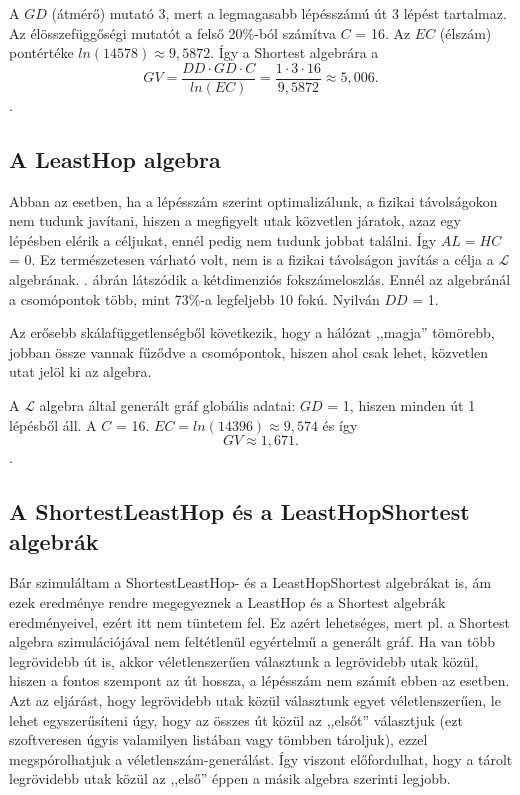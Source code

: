     A $GD$ (átmérő) mutató 3, mert a legmagasabb lépésszámú út 3 lépést tartalmaz. Az élösszefüggőségi mutatót a felső 20\%-ból számítva $C$ = 16. Az $EC$ (élszám) pontértéke $ln(14578) \approx 9,5872$. Így a Shortest algebrára a $$GV = \frac{DD \cdot GD \cdot C}{ln(EC)} = \frac{1 \cdot 3 \cdot 16}{9,5872} \approx 5,006.$$.

    \subsection{A LeastHop algebra}
    Abban az esetben, ha a lépésszám szerint optimalizálunk, a fizikai távolságokon nem tudunk javítani, hiszen a megfigyelt utak közvetlen járatok, azaz egy lépésben elérik a céljukat, ennél pedig nem tudunk jobbat találni. Így $AL=HC$ = 0. Ez természetesen várható volt, nem is a fizikai távolságon javítás a célja a $\mathcal{L}$ algebrának. . ábrán látszódik a kétdimenziós fokszámeloszlás. Ennél az algebránál a csomópontok több, mint 73\%-a legfeljebb 10 fokú. Nyilván $DD$ = 1.

    Az erősebb skálafüggetlenségből következik, hogy a hálózat ,,magja'' tömörebb, jobban össze vannak fűződve a csomópontok, hiszen ahol csak lehet, közvetlen utat jelöl ki az algebra.

    A $\mathcal{L}$ algebra által generált gráf globális adatai: $GD$ = 1, hiszen minden út 1 lépésből áll. A $C$ = 16. $EC=ln(14396) \approx 9,574$ és így $$GV \approx 1,671.$$.

    \subsection{A ShortestLeastHop és a LeastHopShortest algebrák}
    Bár szimuláltam a ShortestLeastHop- és a LeastHopShortest algebrákat is, ám ezek eredménye rendre megegyeznek a LeastHop és a Shortest algebrák eredményeivel, ezért itt nem tüntetem fel. Ez azért lehetséges, mert pl. a Shortest algebra szimulációjával nem feltétlenül egyértelmű a generált gráf. Ha van több legrövidebb út is, akkor véletlenszerűen választunk a legrövidebb utak közül, hiszen a fontos szempont az út hossza, a lépésszám nem számít ebben az esetben. Azt az eljárást, hogy legrövidebb utak közül választunk egyet véletlenszerűen, le lehet egyszerűsíteni úgy, hogy az összes út közül az ,,elsőt'' választjuk (ezt szoftveresen úgyis valamilyen listában vagy tömbben tároljuk), ezzel megspórolhatjuk a véletlenszám-generálást. Így viszont előfordulhat, hogy a tárolt legrövidebb utak közül az ,,első'' éppen a másik algebra szerinti legjobb.

